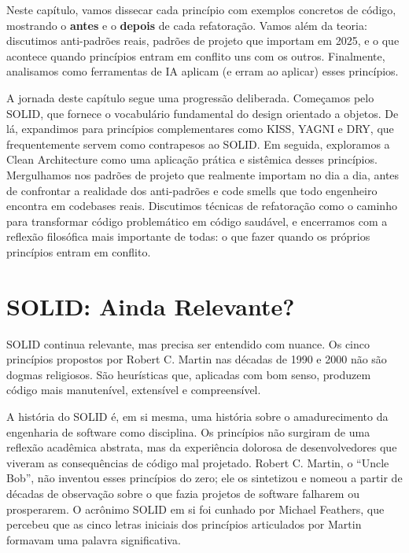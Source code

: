 Neste capítulo, vamos dissecar cada princípio com exemplos concretos de código,
mostrando o \textbf{antes} e o \textbf{depois} de cada refatoração. Vamos além da
teoria: discutimos anti-padrões reais, padrões de projeto que importam em 2025, e
o que acontece quando princípios entram em conflito uns com os outros. Finalmente,
analisamos como ferramentas de IA aplicam (e erram ao aplicar) esses princípios.

A jornada deste capítulo segue uma progressão deliberada. Começamos pelo SOLID,
que fornece o vocabulário fundamental do design orientado a objetos. De lá,
expandimos para princípios complementares como KISS, YAGNI e DRY, que
frequentemente servem como contrapesos ao SOLID. Em seguida, exploramos a Clean
Architecture como uma aplicação prática e sistêmica desses princípios.
Mergulhamos nos padrões de projeto que realmente importam no dia a dia, antes
de confrontar a realidade dos anti-padrões e code smells que todo engenheiro
encontra em codebases reais. Discutimos técnicas de refatoração como o caminho
para transformar código problemático em código saudável, e encerramos com a
reflexão filosófica mais importante de todas: o que fazer quando os próprios
princípios entram em conflito.


\section{SOLID: Ainda Relevante?}

SOLID continua relevante, mas precisa ser entendido com nuance. Os cinco princípios
propostos por Robert C. Martin nas décadas de 1990 e 2000 não são dogmas religiosos.
São heurísticas que, aplicadas com bom senso, produzem código mais manutenível,
extensível e compreensível.

A história do SOLID é, em si mesma, uma história sobre o amadurecimento da
engenharia de software como disciplina. Os princípios não surgiram de uma
reflexão acadêmica abstrata, mas da experiência dolorosa de desenvolvedores
que viveram as consequências de código mal projetado. Robert C. Martin,
o ``Uncle Bob'', não inventou esses princípios do zero; ele os sintetizou e
nomeou a partir de décadas de observação sobre o que fazia projetos de
software falharem ou prosperarem. O acrônimo SOLID em si foi cunhado por
Michael Feathers, que percebeu que as cinco letras iniciais dos princípios
articulados por Martin formavam uma palavra significativa.

